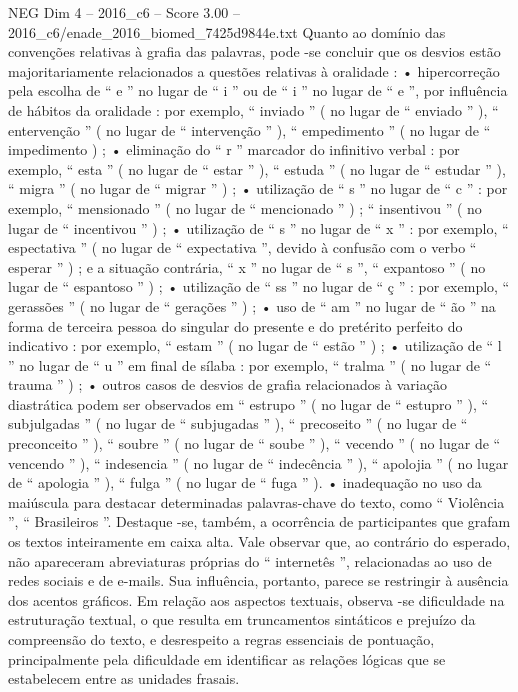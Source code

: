 \begin{textsample}{NEG Dim 4 – 2016\_c6 – Score 3.00 – 2016\_c6/enade\_2016\_biomed\_7425d9844e.txt}
Quanto ao domínio das convenções relativas à grafia das palavras, pode -se concluir que os desvios estão majoritariamente relacionados a questões relativas à oralidade : • hipercorreção pela escolha de “ e ” no lugar de “ i ” ou de “ i ” no lugar de “ e ”, por influência de hábitos da oralidade : por exemplo, “ inviado ” ( no lugar de “ enviado ” ), “ entervenção ” ( no lugar de “ intervenção ” ), “ empedimento ” ( no lugar de “ impedimento ) ; • eliminação do “ r ” marcador do infinitivo verbal : por exemplo, “ esta ” ( no lugar de “ estar ” ), “ estuda ” ( no lugar de “ estudar ” ), “ migra ” ( no lugar de “ migrar ” ) ; • utilização de “ s ” no lugar de “ c ” : por exemplo, “ mensionado ” ( no lugar de “ mencionado ” ) ; “ insentivou ” ( no lugar de “ incentivou ” ) ; • utilização de “ s ” no lugar de “ x ” : por exemplo, “ espectativa ” ( no lugar de “ expectativa ”, devido à confusão com o verbo “ esperar ” ) ; e a situação contrária, “ x ” no lugar de “ s ”, “ expantoso ” ( no lugar de “ espantoso ” ) ; • utilização de “ ss ” no lugar de “ ç ” : por exemplo, “ gerassões ” ( no lugar de “ gerações ” ) ; • uso de “ am ” no lugar de “ ão ” na forma de terceira pessoa do singular do presente e do pretérito perfeito do indicativo : por exemplo, “ estam ” ( no lugar de “ estão ” ) ; • utilização de “ l ” no lugar de “ u ” em final de sílaba : por exemplo, “ tralma ” ( no lugar de “ trauma ” ) ; • outros casos de desvios de grafia relacionados à variação diastrática podem ser observados em “ estrupo ” ( no lugar de “ estupro ” ), “ subjulgadas ” ( no lugar de “ subjugadas ” ), “ precoseito ” ( no lugar de “ preconceito ” ), “ soubre ” ( no lugar de “ soube ” ), “ vecendo ” ( no lugar de “ vencendo ” ), “ indesencia ” ( no lugar de “ indecência ” ), “ apolojia ” ( no lugar de “ apologia ” ), “ fulga ” ( no lugar de “ fuga ” ). • inadequação no uso da maiúscula para destacar determinadas palavras-chave do texto, como “ Violência ”, “ Brasileiros ”.
Destaque -se, também, a ocorrência de participantes que grafam os textos inteiramente em caixa alta.
Vale observar que, ao contrário do esperado, não apareceram abreviaturas próprias do “ internetês ”, relacionadas ao uso de redes sociais e de e-mails.
Sua influência, portanto, parece se restringir à ausência dos acentos gráficos.
Em relação aos aspectos textuais, observa -se dificuldade na estruturação textual, o que resulta em truncamentos sintáticos e prejuízo da compreensão do texto, e desrespeito a regras essenciais de pontuação, principalmente pela dificuldade em identificar as relações lógicas que se estabelecem entre as unidades frasais.

\end{textsample}
